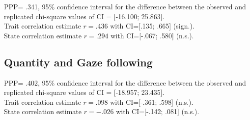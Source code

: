 PPP= .341, 95\% confidence interval for the difference between the observed and replicated chi-square values of CI = [-16.100; 25.863].\\
Trait correlation estimate $r=.436$ with CI=[.135; .665] (sign.).  \\
State correlation estimate $r= .294$ with CI=[-.067; .580] (n.s.).\\

\subsection{Quantity and Gaze following}

PPP= .402, 95\% confidence interval for the difference between the observed and replicated chi-square values of CI = [-18.957; 23.435].\\
Trait correlation estimate $r=.098$ with CI=[-.361; .598] (n.s.).  \\
State correlation estimate $r= - .026$ with CI=[-.142; .081] (n.s.).

